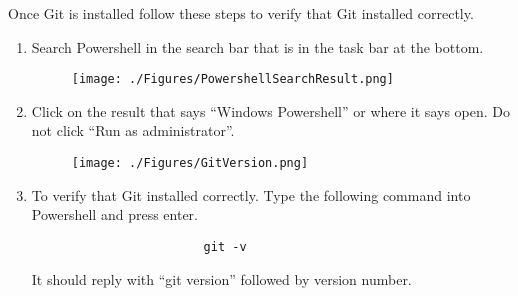 \documentclass[12pt]{article}
\begin{document}
Once Git is installed follow these steps to verify that Git installed correctly.
\begin{center}
	\begin{enumerate}
		\begin{figure}[H]
			\texttt{[image: ./Figures/SearchBar.png]}
		\end{figure}
		\item Search Powershell in the search bar that is in the task bar at the bottom.
		      \begin{figure}[H]
			      \texttt{[image: ./Figures/PowershellSearchResult.png]}
		      \end{figure}
		\item Click on the result that says ``Windows Powershell'' or where it says open. Do not click ``Run as administrator''.
		      \begin{figure}[H]
			      \texttt{[image: ./Figures/GitVersion.png]}
		      \end{figure}
		\item To verify that Git installed correctly. Type the following command into Powershell and press enter.
		      \begin{verbatim}
                        git -v
                      \end{verbatim}
		      It should reply with ``git version'' followed by version number.
	\end{enumerate}
\end{center}
\end{document}
